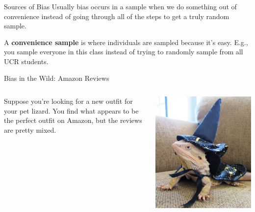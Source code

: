 \begin{frame}{Sources of Bias}   
    \vspace{12pt}
    Usually bias occurs in a sample when we do something out of convenience instead of going through all of the steps to get a truly random sample. 
    
    \vspace{12pt}
    A \textbf{convenience sample} is where individuals are sampled because it's easy. E.g., you sample everyone in this class instead of trying to randomly sample from all UCR students. 
\end{frame}

\begin{frame}{Bias in the Wild: Amazon Reviews}
    \begin{columns}[T] %
    \begin{column}{.48\textwidth}
        \vspace{2cm}
        
        Suppose you're looking for a new outfit for your pet lizard. You find what appears to be the perfect outfit on Amazon, but the reviews are pretty mixed.
    \end{column}%
    \hfill%
    \begin{column}{.48\textwidth}
    \includegraphics[scale=0.25]{images/lizard.jpg}
    \end{column}%
    \end{columns}
\end{frame}

